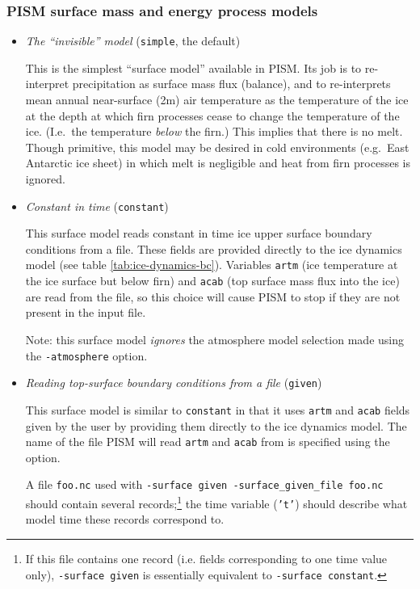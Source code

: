 \subsubsection{PISM surface mass and energy process models}
\label{sec:pism-surface-snow}

\begin{itemize}
  \item \emph{The ``invisible'' model} (\texttt{simple}, the default)

    This is the simplest ``surface model'' available in PISM.  Its job is to re-interpret  precipitation as surface mass flux (balance), and to re-interprets mean annual near-surface (2m) air temperature as the temperature of the ice at the depth at which firn processes cease to change the temperature of the ice.  (I.e.~the temperature \emph{below} the firn.)  This implies that there is no melt.  Though primitive, this model may be desired in cold environments (e.g.~East Antarctic ice sheet) in which melt is negligible and heat from firn processes is ignored.

  \item \emph{Constant in time} (\texttt{constant})

    This surface model reads constant in time ice upper surface boundary conditions from a file.  These fields are provided directly to the ice dynamics model (see table \ref{tab:ice-dynamics-bc}).  Variables \texttt{artm} (ice temperature at the ice surface but below firn) and \texttt{acab} (top surface mass flux into the ice) are read from the file, so this choice will cause PISM to stop if they are not present in the input file.

    Note: this surface model \emph{ignores} the atmosphere model selection made using the \texttt{-atmosphere} option.

  \item \emph{Reading top-surface boundary conditions from a file} (\texttt{given})

    This surface model is similar to \texttt{constant} in that it uses \texttt{artm} and \texttt{acab} fields given by the user by providing them directly to the ice dynamics model. The name of the file PISM will read \texttt{artm} and \texttt{acab} from is specified using the  option.

    A file \texttt{foo.nc} used with \texttt{-surface given -surface_given_file foo.nc} should contain several records;\footnote{If this file contains one record (i.e. fields corresponding to one time value only), \texttt{-surface given} is essentially equivalent to \texttt{-surface constant}.} the time variable (\texttt{'t'}) should describe what model time these records correspond to.


\end{itemize}

